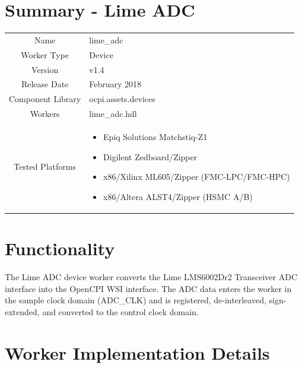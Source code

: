 \documentclass{article}
\author{} %
\date{Version \docVersion} %
\title{\docTitle}
\def\docVersion{1.4}
\def\comp{lime\_adc}
\def\Comp{Lime ADC}
\begin{document}
\section*{Summary - \Comp}
\begin{tabular}{|c|M{13.5cm}|}
	\hline
	                  &                  \\
	\hline
	Name              & \comp            \\
	\hline
	Worker Type       & Device           \\
	\hline
	Version           & v\docVersion \\
	\hline
	Release Date      & February 2018 \\
	\hline
	Component Library & ocpi.assets.devices     \\
	\hline
	Workers           & \comp.hdl        \\
	\hline
	Tested Platforms  &
\begin{itemize}
  \item Epiq Solutions Matchstiq-Z1
  \item Digilent Zedboard/Zipper
  \item x86/Xilinx ML605/Zipper (FMC-LPC/FMC-HPC)
  \item x86/Altera ALST4/Zipper (HSMC A/B)
\end{itemize} \\
	\hline
\end{tabular}

\section*{Functionality}
\begin{flushleft}
	The Lime ADC device worker converts the Lime LMS6002Dr2 Transceiver ADC interface into the OpenCPI WSI interface. The ADC data enters the worker in the sample clock domain (ADC\_CLK) and is registered, de-interleaved, sign-extended, and converted to the control clock domain.
\end{flushleft}

\section*{Worker Implementation Details}
\end{document}
